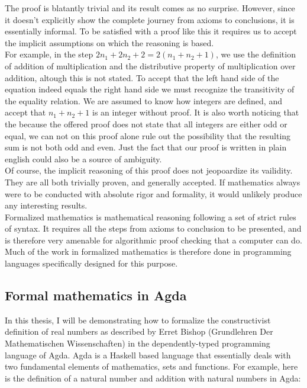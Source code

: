 \documentclass[11pt,a4paper]{article}
\begin{document}
The proof is blatantly trivial and its result comes as no surprise. However, since it doesn't explicitly show the complete journey from axioms to conclusions, it is essentially informal. To be satisfied with a proof like this it requires us to accept the implicit assumptions on which the reasoning is based.\\
For example, in the step $2n_1+2n_2+2 = 2(n_1+n_2+1)$, we use the definition of addition of multiplication and the distributive property of multiplication over addition, altough this is not stated. To accept that the left hand side of the equation indeed equals the right hand side we must recognize the transitivity of the equality relation. We are assumed to know how integers are defined, and accept that $n_1+n_2+1$ is an integer without proof. It is also worth noticing that the because the offered proof does not state that all integers are either odd or equal, we can not on this proof alone rule out the possibility that the resulting sum is not both odd and even. Just the fact that our proof is written in plain english could also be a source of ambiguity.\\

Of course, the implicit reasoning of this proof does not jeopoardize its vailidity. They are all both trivially proven, and generally accepted. If mathematics always were to be conducted with absolute rigor and formality, it would unlikely produce any interesting results.\\

Formalized mathematics is mathematical reasoning following a set of strict rules of syntax. It requires all the steps from axioms to conclusion to be presented, and is therefore very amenable for algorithmic proof checking that a computer can do. Much of the work in formalized mathematics is therefore done in programming languages specifically designed for this purpose. \\

\subsection{Formal mathematics in Agda}\label{subsec: Agda}
In this thesis, I will be demonstrating how to formalize the constructivist definition of real numbers as described by Erret Bishop (Grundlehren Der Mathematischen Wissenschaften) in the dependently-typed programming language of Agda. Agda is a Haskell based language that essentially deals with two fundamental elements of mathematics, sets and functions. For example, here is the definition of a natural number and addition with natural numbers in Agda:\\
\end{document}
